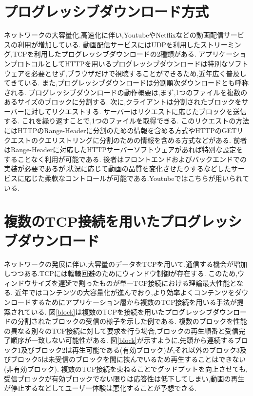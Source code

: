 \documentclass[a4j,12pt]{gradthesis_utf8}
\begin{document}
\newpage

\section{プログレッシブダウンロード方式}
ネットワークの大容量化,高速化に伴い,Youtube\cite{youtube}やNetflix\cite{netflix}などの動画配信サービスの利用が増加している.
動画配信サービスにはUDPを利用したストリーミング,TCPを利用したプログレッシブダウンロードの2種類がある.
アプリケーションプロトコルとしてHTTPを用いるプログレッシブダウンロードは特別なソフトウェアを必要とせず,ブラウザだけで視聴することができるため,近年広く普及してきている.
また,プログレッシブダウンロードは分割順次ダウンロードとも呼称される.
プログレッシブダウンロードの動作概要は,まず,1つのファイルを複数のあるサイズのブロックに分割する.
次に,クライアントは分割されたブロックをサーバーに対してリクエストする.
サーバーはリクエストに応じたブロックを送信する.
これを繰り返すことで,1つのファイルを取得できる.
このリクエストの方法にはHTTPのRange-Headerに分割のための情報を含める方式やHTTPのGETリクエストのクエリストリングに分割のための情報を含める方式などがある.
前者はRange-Headerに対応したHTTPサーバーソフトウェアがあれば特別な設定をすることなく利用が可能である.
後者はフロントエンドおよびバックエンドでの実装が必要であるが,状況に応じて動画の品質を変化させたりするなどしたサービスに応じた柔軟なコントロールが可能である.Youtubeではこちらが用いられている.

\newpage

\section{複数のTCP接続を用いたプログレッシブダウンロード}
\label{hukusu}
ネットワークの発展に伴い,大容量のデータをTCPを用いて,通信する機会が増加しつつある.TCPには輻輳回避のためにウィンドウ制御が存在する.
このため,ウィンドウサイズを遅延で割ったものが単一TCP接続における理論最大性能となる.
近年ではコンテンツの大容量化が進んでおり,より効率よくコンテンツをダウンロードするためにアプリケーション層から複数のTCP接続を用いる手法が提案されている.
図\ref{block}は複数のTCPを接続を用いたプログレッシブダウンロードの分割されたブロックの受信の様子を示した例である.
複数のブロックを性能の異なる別々のTCP接続に対して要求を行う場合,ブロックの再生順番と受信完了順序が一致しない可能性がある.
図\ref{block}が示すように,先頭から連続するブロック1及びブロック2は再生可能である(有効ブロック)が,それ以外のブロック3及びブロック5は未受信のブロックを間に挟んでいるため再生することはできない(非有効ブロック).
複数のTCP接続を束ねることでグッドプットを向上させても,受信ブロックが有効ブロックでない限りは応答性は低下してしまい,動画の再生が停止するなどしてユーザー体験は悪化することが予想できる.
 
\end{document}
